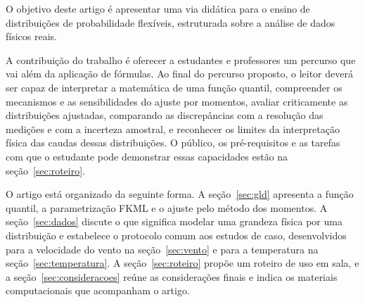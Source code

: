 O objetivo deste artigo é apresentar uma via didática para o ensino de distribuições de probabilidade flexíveis, estruturada sobre a análise de dados físicos reais.

A contribuição do trabalho é oferecer a estudantes e professores um percurso que vai além da aplicação de fórmulas. Ao final do percurso proposto, o leitor deverá ser capaz de interpretar a matemática de uma função quantil, compreender os mecanismos e as sensibilidades do ajuste por momentos, avaliar criticamente as distribuições ajustadas, comparando as discrepâncias com a resolução das medições e com a incerteza amostral, e reconhecer os limites da interpretação física das caudas dessas distribuições. O público, os pré-requisitos e as tarefas com que o estudante pode demonstrar essas capacidades estão na seção~\ref{sec:roteiro}.

O artigo está organizado da seguinte forma. A seção~\ref{sec:gld} apresenta a função quantil, a parametrização FKML e o ajuste pelo método dos momentos. A seção~\ref{sec:dados} discute o que significa modelar uma grandeza física por uma distribuição e estabelece o protocolo comum aos estudos de caso, desenvolvidos para a velocidade do vento na seção~\ref{sec:vento} e para a temperatura na seção~\ref{sec:temperatura}. A seção~\ref{sec:roteiro} propõe um roteiro de uso em sala, e a seção~\ref{sec:consideracoes} reúne as considerações finais e indica os materiais computacionais que acompanham o artigo.
